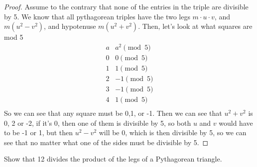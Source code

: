 \documentclass[11pt]{article}
\newenvironment{problem}[2][Problem]{\begin{trivlist}
\item[\hskip \labelsep {\bfseries #1}\hskip \labelsep {\bfseries #2.}]}{\end{trivlist}}
\begin{document}
\begin{proof}
  Assume to the contrary that none of the entries in the triple are divisible by 5. We know that all pythagorean triples have the two legs $m\cdot u \cdot v$, and $m(u^2-v^2)$, and hypotenuse $m(u^2+v^2)$. Then, let's look at what squares are mod 5
  \[
    \begin{array}{c|c}
      a & a^2 \pmod{5} \\
      \hline
      0 & 0 \pmod{5}   \\
      1 & 1 \pmod{5}   \\
      2 & -1 \pmod{5}  \\
      3 & -1 \pmod{5}  \\
      4 & 1 \pmod{5}   \\
    \end{array}
  \]
  So we can see that any square must be 0,1, or -1. Then we can see that $u^2+v^2$ is 0, 2 or -2, if it's 0, then one of them is divisible by 5, so both $u$ and $v$ would have to be -1 or 1, but then $u^2-v^2$ will be 0, which is then divisible by 5, so we can see that no matter what one of the sides must be divisible by 5.
\end{proof}



\begin{problem}{10}
Show that 12 divides the product of the legs of a Pythagorean triangle.
\end{problem}
\end{document}
